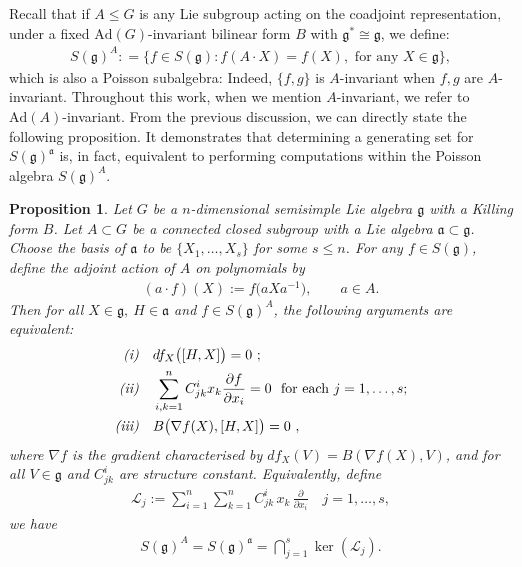 \documentclass[11pt,reqno]{amsart}
\newtheorem*{theorem A}{Main Theorem A}
\newtheorem*{theorem B}{Main Theorem B}
\newtheorem*{theorem C}{Main Theorem C}
\newtheorem*{theorem D}{Main Theorem D}
\newtheorem{proposition}[theorem]{Proposition}
\theoremstyle{definition}
\theoremstyle{plain}
\theoremstyle{conclusion}
\begin{document}
 

Recall that if $A\leq G$ is any Lie subgroup acting on the coadjoint representation, under a fixed $\mathrm{Ad}(G)$-invariant bilinear form $B$ with $\mathfrak{g}^* \cong \mathfrak{g}$, we define:  \begin{align}
  S(\mathfrak{g})^A: = \bigl\{f \in S(\mathfrak{g}): f(A \cdot X) = f(X), \text{ for any } X \in \mathfrak{g}\bigr\}, \label{eq:sga}  
\end{align} which is also a Poisson subalgebra: Indeed, $\{f,g\}$ is $A$-invariant when $f,g$ are $A$-invariant. Throughout this work, when we mention $A$-invariant, we refer to $\mathrm{Ad}(A)$-invariant. %
From the previous discussion, we can directly state the following proposition. It demonstrates that determining a generating set for $S(\mathfrak{g})^{\mathfrak{a}}$ is, in fact, equivalent to performing computations within the Poisson algebra $S(\mathfrak{g})^A$. 

\begin{proposition}
\label{prop:equ}
Let $G$ be a $n$-dimensional semisimple Lie algebra $\mathfrak{g}$ with a Killing form $B$. %
 Let $A\subset G$ be a connected closed subgroup with a Lie algebra $\mathfrak{a}\subset\mathfrak{g}$. Choose the basis of $\mathfrak{a}$ to be $\{X_1,\dots,X_s\}$ for some $s\leq n$. For any $f\in S(\mathfrak{g})$, define the adjoint action of $A$ on polynomials by
\begin{align*}
(a \cdot  f)(X):=f\big(aXa^{-1}\big),\qquad a\in A .
\end{align*}
Then for all $X\in\mathfrak{g},\ H\in\mathfrak{a}$ and $f \in S(\mathfrak{g})^A$, the following arguments are equivalent:
\begin{align*}
\text{\emph{(i)}}\quad & df_X \big([H,X]\big)=0\ ;\\
\text{\emph{(ii)}}\quad &
\sum_{i,k=1}^n  C_{jk}^i x_k \frac{\partial f}{\partial x_i} =0
\ \ \text{for each }j=1,\dots,s;\\
\text{\emph{(iii)}}\quad & B \big(\nabla f(X),[H,X]\big)=0\ ,
\end{align*} where $\nabla f$ is the gradient characterised by $df_X(V)=B(\nabla f(X),V)$, and for all $V\in\mathfrak{g}$ and $C_{jk}^i$ are structure constant. Equivalently, define
\begin{align*}
\mathcal{L}_j:=\sum_{i=1}^n\sum_{k=1}^n C_{jk}^i\,x_k\,\frac{\partial}{\partial x_i}\quad  j=1,\dots,s ,
\end{align*} we have \begin{align}
S(\mathfrak{g})^A=S(\mathfrak{g})^{\mathfrak{a}}=\bigcap_{j=1}^s \ker(\mathcal{L}_j). \label{eq:pdefin}
\end{align}
\end{proposition}
\end{document}
